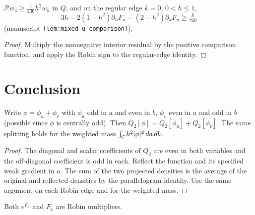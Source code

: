 \begin{lemma}
\label{lem:mixed-u-comparison}
\leanok
$\mathcal Pw_u\ge\tfrac1{200}h^2w_u$ in $Q$, and on the regular edge
$k=0$, $0<h\le1$,
\[
  3h-2(1-h^2)\partial_hF_u-(2-h^2)\partial_kF_u\ge\tfrac h{250}
\]
(manuscript \texttt{(lem:mixed-u-comparison)}).
\end{lemma}

\begin{proof}
\leanok
Multiply the nonnegative interior residual by the positive comparison
function, and apply the Robin sign to the regular-edge identity.
\end{proof}

\section{Conclusion}

\begin{lemma}
\label{lem:mixed-parity-split}
\leanok
Write $\phi=\phi_u+\phi_v$ with $\phi_u$ odd in $a$ and even in $b$, $\phi_v$
even in $a$ and odd in $b$ (possible since $\phi$ is centrally odd). Then
$Q_2[\phi]=Q_2[\phi_u]+Q_2[\phi_v]$.
The same splitting holds for the weighted mass $\int_{\mathcal{C}} h^2|\phi|^2\,da\,db$.
\end{lemma}

\begin{proof}
\leanok
The diagonal and scalar coefficients of $Q_2$ are even in both variables and
the off-diagonal coefficient is odd in each. Reflect the function and its
specified weak gradient in $a$. The sum of the two projected
densities is the average of the original and reflected densities by the
parallelogram identity. Use the same argument on each Robin edge and
for the weighted mass.
\end{proof}

\begin{lemma}
\label{lem:mixed-robin-multipliers}
\leanok
Both $e^{F_u}$ and $F_v$ are Robin multipliers.
\end{lemma}


